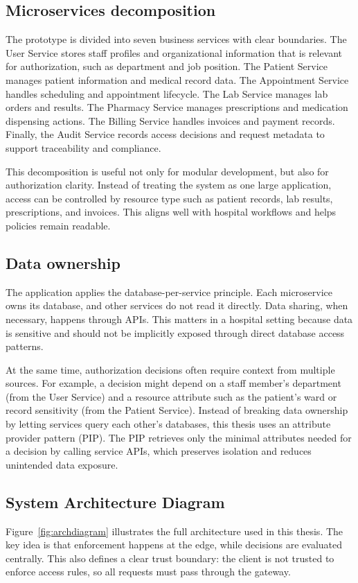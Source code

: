 \subsection{Microservices decomposition}
The prototype is divided into seven business services with clear boundaries. The User Service stores staff profiles and organizational information that is relevant for authorization, such as department and job position. The Patient Service manages patient information and medical record data. The Appointment Service handles scheduling and appointment lifecycle. The Lab Service manages lab orders and results. The Pharmacy Service manages prescriptions and medication dispensing actions. The Billing Service handles invoices and payment records. Finally, the Audit Service records access decisions and request metadata to support traceability and compliance.
\vspace{0.5cm}


This decomposition is useful not only for modular development, but also for authorization clarity. Instead of treating the system as one large application, access can be controlled by resource type such as patient records, lab results, prescriptions, and invoices. This aligns well with hospital workflows and helps policies remain readable.


\subsection{Data ownership}
The application applies the database-per-service principle. Each microservice owns its database, and other services do not read it directly. Data sharing, when necessary, happens through APIs. This matters in a hospital setting because data is sensitive and should not be implicitly exposed through direct database access patterns.
\vspace{0.5cm}


At the same time, authorization decisions often require context from multiple sources. For example, a decision might depend on a staff member’s department (from the User Service) and a resource attribute such as the patient’s ward or record sensitivity (from the Patient Service). Instead of breaking data ownership by letting services query each other’s databases, this thesis uses an attribute provider pattern (PIP). The PIP retrieves only the minimal attributes needed for a decision by calling service APIs, which preserves isolation and reduces unintended data exposure.


\subsection{System Architecture Diagram}
\label{sec:sysarchitecture}
Figure~\ref{fig:archdiagram} illustrates the full architecture used in this thesis. The key idea is that enforcement happens at the edge, while decisions are evaluated centrally. This also defines a clear trust boundary: the client is not trusted to enforce access rules, so all requests must pass through the gateway.
\vspace{0.5cm}



